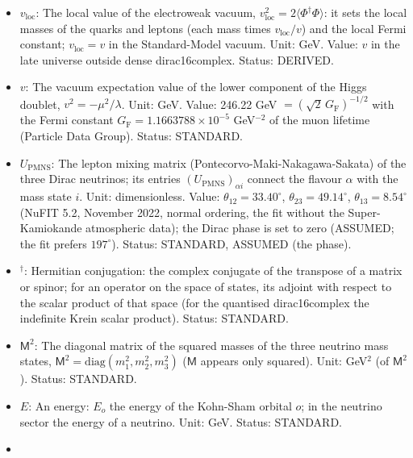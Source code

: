 \documentclass[
  10pt,
]{article}
\begin{document}
\begin{itemize}
  terms (\(3 \times 3\) matrices) of the neutrinos and the antineutrinos
  of momentum \(\vec p\): the rates of change of \(\varrho_{\vec p}\)
  and \(\bar\varrho_{\vec p}\) by emission, absorption, scattering and
  pair processes with the matter. Unit: GeV. Status: STANDARD.
\item
  \(v_{\mathrm{loc}}\): The local value of the electroweak vacuum,
  \(v_{\mathrm{loc}}^2 = 2\langle\Phi^\dagger\Phi\rangle\): it sets the
  local masses of the quarks and leptons (each mass times
  \(v_{\mathrm{loc}}/v\)) and the local Fermi constant;
  \(v_{\mathrm{loc}} = v\) in the Standard-Model vacuum. Unit: GeV.
  Value: \(v\) in the late universe outside dense dirac16complex.
  Status: DERIVED.
\item
  \(v\): The vacuum expectation value of the lower component of the
  Higgs doublet, \(v^2 = -\mu^2/\lambda\). Unit: GeV. Value: 246.22 GeV
  \(= (\sqrt2\,G_{\mathrm{F}})^{-1/2}\) with the Fermi constant
  \(G_{\mathrm{F}} = 1.1663788\times10^{-5}\) GeV\(^{-2}\) of the muon
  lifetime (Particle Data Group). Status: STANDARD.
\item
  \(U_{\mathrm{PMNS}}\): The lepton mixing matrix
  (Pontecorvo-Maki-Nakagawa-Sakata) of the three Dirac neutrinos; its
  entries \((U_{\mathrm{PMNS}})_{\alpha i}\) connect the flavour
  \(\alpha\) with the mass state \(i\). Unit: dimensionless. Value:
  \(\theta_{12} = 33.40^\circ\), \(\theta_{23} = 49.14^\circ\),
  \(\theta_{13} = 8.54^\circ\) (NuFIT 5.2, November 2022, normal
  ordering, the fit without the Super-Kamiokande atmospheric data); the
  Dirac phase is set to zero (ASSUMED; the fit prefers \(197^\circ\)).
  Status: STANDARD, ASSUMED (the phase).
\item
  \({}^\dagger\): Hermitian conjugation: the complex conjugate of the
  transpose of a matrix or spinor; for an operator on the space of
  states, its adjoint with respect to the scalar product of that space
  (for the quantised dirac16complex the indefinite Krein scalar
  product). Status: STANDARD.
\item
  \(\mathsf{M}^2\): The diagonal matrix of the squared masses of the
  three neutrino mass states,
  \(\mathsf{M}^2 = \mathrm{diag}(m_1^2, m_2^2, m_3^2)\) (\(\mathsf{M}\)
  appears only squared). Unit: GeV\(^2\) (of \(\mathsf{M}^2\)). Status:
  STANDARD.
\item
  \(E\): An energy: \(E_o\) the energy of the Kohn-Sham orbital \(o\);
  in the neutrino sector the energy of a neutrino. Unit: GeV. Status:
  STANDARD.
\item

\end{itemize}
\end{document}
